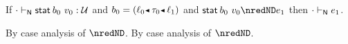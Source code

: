 \begin{lemma}\label{H-sta-type-preservation}
  If\/ $\snil \sWTN \estab{\sbnd_0}{\svalue_0} : \tdyn$
  and\/ $\sbnd_0 \eeq \obnd{\sowner_0}{\stype_0}{\sowner_1}$
  and\/ $\estab{\sbnd_0}{\svalue_0} \nredND \sexpr_1$
  then\/ $\snil \sWTN \sexpr_1$.
\end{lemma}{
  \newcommand{\shortproof}{By case analysis of $\nredND$.}
\begin{lamportproof*}
  \shortproof
\mainproof
  \shortproof

    \begin{pfproof}
      \qedstep
        \begin{pfproof}
          \begin{mathpar}
          \end{mathpar}
        \end{pfproof}
    \end{pfproof}

    \begin{pfproof}
      \qedstep
        \begin{pfproof}\begin{mathpar}
        \end{mathpar}\end{pfproof}
    \end{pfproof}


\end{lamportproof*}}
